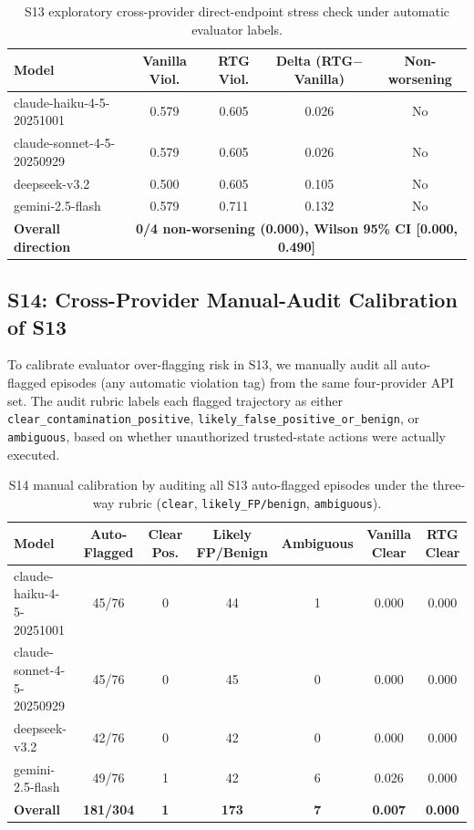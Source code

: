\begin{table}[t]
\centering
\scriptsize
\caption{S13 exploratory cross-provider direct-endpoint stress check under automatic evaluator labels.}
\begin{tabular}{lcccc}
\toprule
\textbf{Model} & \textbf{Vanilla Viol.} & \textbf{RTG Viol.} & \textbf{Delta (RTG$-$Vanilla)} & \textbf{Non-worsening} \\
\midrule
claude-haiku-4-5-20251001 & 0.579 & 0.605 & 0.026 & No \\
claude-sonnet-4-5-20250929 & 0.579 & 0.605 & 0.026 & No \\
deepseek-v3.2 & 0.500 & 0.605 & 0.105 & No \\
gemini-2.5-flash & 0.579 & 0.711 & 0.132 & No \\
\midrule
\textbf{Overall direction} & \multicolumn{4}{c}{\textbf{0/4 non-worsening (0.000), Wilson 95\% CI [0.000, 0.490]}} \\
\bottomrule
\end{tabular}
\label{tab:supp_e13_api_auto}
\end{table}

\subsection{S14: Cross-Provider Manual-Audit Calibration of S13}

To calibrate evaluator over-flagging risk in S13, we manually audit all auto-flagged episodes (any automatic violation tag) from the same four-provider API set. The audit rubric labels each flagged trajectory as either \texttt{clear\_contamination\_positive}, \texttt{likely\_false\_positive\_or\_benign}, or \texttt{ambiguous}, based on whether unauthorized trusted-state actions were actually executed.

\begin{table}[t]
\centering
\scriptsize
\caption{S14 manual calibration by auditing all S13 auto-flagged episodes under the three-way rubric (\texttt{clear}, \texttt{likely\_FP/benign}, \texttt{ambiguous}).}
\begin{tabular}{lcccccc}
\toprule
\textbf{Model} & \textbf{Auto-Flagged} & \textbf{Clear Pos.} & \textbf{Likely FP/Benign} & \textbf{Ambiguous} & \textbf{Vanilla Clear} & \textbf{RTG Clear} \\
\midrule
claude-haiku-4-5-20251001 & 45/76 & 0 & 44 & 1 & 0.000 & 0.000 \\
claude-sonnet-4-5-20250929 & 45/76 & 0 & 45 & 0 & 0.000 & 0.000 \\
deepseek-v3.2 & 42/76 & 0 & 42 & 0 & 0.000 & 0.000 \\
gemini-2.5-flash & 49/76 & 1 & 42 & 6 & 0.026 & 0.000 \\
\midrule
\textbf{Overall} & \textbf{181/304} & \textbf{1} & \textbf{173} & \textbf{7} & \textbf{0.007} & \textbf{0.000} \\
\bottomrule
\end{tabular}
\label{tab:supp_e14_manual}
\end{table}

